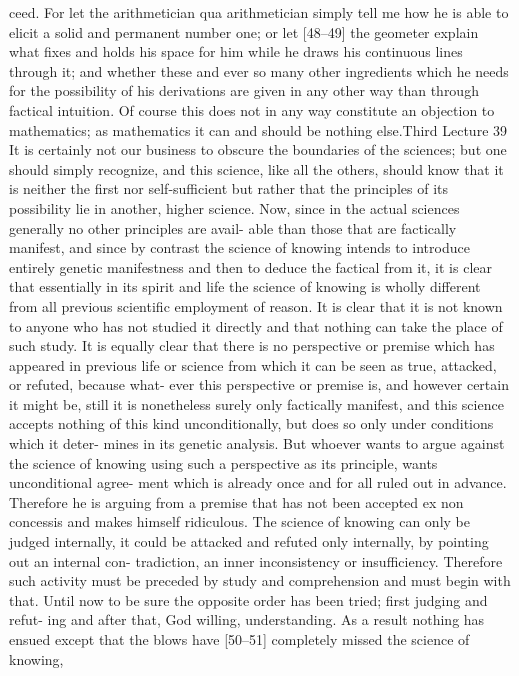 ceed. For let the arithmetician qua arithmetician simply tell me how he is able
to elicit a solid and permanent number one; or let [48–49] the geometer
explain what fixes and holds his space for him while he draws his continuous
lines through it; and whether these and ever so many other ingredients which
he needs for the possibility of his derivations are given in any other way than
through factical intuition. Of course this does not in any way constitute an
objection to mathematics; as mathematics it can and should be nothing else.Third Lecture
39
It is certainly not our business to obscure the boundaries of the sciences; but
one should simply recognize, and this science, like all the others, should know
that it is neither the first nor self-sufficient but rather that the principles of its
possibility lie in another, higher science.
Now, since in the actual sciences generally no other principles are avail-
able than those that are factically manifest, and since by contrast the science
of knowing intends to introduce entirely genetic manifestness and then to
deduce the factical from it, it is clear that essentially in its spirit and life the
science of knowing is wholly different from all previous scientific employment
of reason. It is clear that it is not known to anyone who has not studied it
directly and that nothing can take the place of such study. It is equally clear
that there is no perspective or premise which has appeared in previous life or
science from which it can be seen as true, attacked, or refuted, because what-
ever this perspective or premise is, and however certain it might be, still it is
nonetheless surely only factically manifest, and this science accepts nothing of
this kind unconditionally, but does so only under conditions which it deter-
mines in its genetic analysis. But whoever wants to argue against the science
of knowing using such a perspective as its principle, wants unconditional agree-
ment which is already once and for all ruled out in advance. Therefore he is
arguing from a premise that has not been accepted {ex non concessis} and makes
himself ridiculous. The science of knowing can only be judged internally, it
could be attacked and refuted only internally, by pointing out an internal con-
tradiction, an inner inconsistency or insufficiency. Therefore such activity
must be preceded by study and comprehension and must begin with that.
Until now to be sure the opposite order has been tried; first judging and refut-
ing and after that, God willing, understanding. As a result nothing has ensued
except that the blows have [50–51] completely missed the science of knowing,
